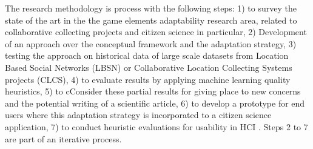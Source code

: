 \documentclass[sigconf]{acmart}
\begin{document}



The research methodology is process with the following steps: 1) to survey the state of the art in the the game elements adaptability research area, related to collaborative collecting projects and citizen science in particular, 2) Development of an approach over the conceptual framework and the adaptation strategy,  3) testing the approach on historical data of large scale datasets from Location Based Social Networks (LBSN) or Collaborative Location Collecting Systems projects (CLCS), 4)  to evaluate results by applying machine learning quality heuristics, 5) to cConsider these partial results for giving place to new concerns and the potential writing of a scientific article, 6) to develop a prototype for end users where this adaptation strategy is incorporated to a citizen science application, 7) to conduct heuristic evaluations for usability in HCI \cite{Nielsen1990}.  Steps 2 to 7 are part of an iterative process.





\end{document}
